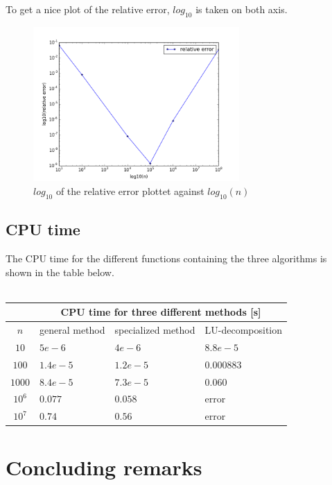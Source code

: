 \documentclass[a4paper,norsk,12pt,oneside]{article}
\begin{document}
To get a nice plot of the relative error, \(log_{10}\) is taken on both axis.

\begin{figure}[H]
    \label{fig_error}
    \centering %
    \includegraphics[width=0.7\textwidth]{relative_error.png}
    \caption{\(log_{10}\) of the relative error plottet against \(log_{10}(n)\) } 
    \end{figure} 

\subsection{CPU time}

The CPU time for the different functions containing the three
algorithms is shown in the table below.\\\\ 

\begin{tabular}{c | l | l | l }
    & \multicolumn{3}{|c|}{CPU time for three different methods [s]} \\ 
    \hline
    \(n\) & general method & specialized method & LU-decomposition\\
    \hline
    \(10\) & \(5e-6\) & \(4e-6\) & \(8.8e-5\) \\
    \(100\) & \(1.4e-5\) & \(1.2e-5\) & \(0.000883\) \\
    \(1000\) & \(8.4e-5\) & \(7.3e-5\) & \(0.060\) \\
    \(10^6\) & \(0.077\) & \(0.058\) & error \\
    \(10^7\) & \(0.74\) & \(0.56\) & error\\
    \hline
    \end{tabular} 

\section{Concluding remarks}
\end{document}
